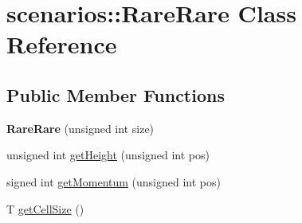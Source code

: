 \hypertarget{classscenarios_1_1RareRare}{\section{scenarios\-:\-:Rare\-Rare Class Reference}
\label{classscenarios_1_1RareRare}
}
\subsection*{Public Member Functions}
\begin{DoxyCompactItemize}
\item 
\hypertarget{classscenarios_1_1RareRare_aed7728389aca6415468961ba3df5f414}{{\bfseries Rare\-Rare} (unsigned int size)}\label{classscenarios_1_1RareRare_aed7728389aca6415468961ba3df5f414}

\item 
unsigned int \hyperlink{classscenarios_1_1RareRare_ac4ee4659dd3440c0295efda9b63769e6}{get\-Height} (unsigned int pos)
\item 
signed int \hyperlink{classscenarios_1_1RareRare_ac1138a29ccd3828ad649964d6b66698b}{get\-Momentum} (unsigned int pos)
\item 
T \hyperlink{classscenarios_1_1RareRare_a228b969ccfcaa05c24dc45114f3b7381}{get\-Cell\-Size} ()
\end{DoxyCompactItemize}


